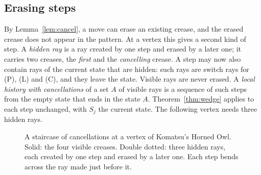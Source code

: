 \documentclass[11pt]{article}
\theoremstyle{definition}
\theoremstyle{remark}
\newcommand{\hid}[1]{\bar{#1}}
\begin{document}
\subsection{Erasing steps}

By Lemma~\ref{lem:cancel}, a move can erase an existing crease, and the erased crease does not appear in the pattern. At a vertex this gives a second kind of step. A \emph{hidden ray} is a ray created by one step and erased by a later one; it carries two creases, the \emph{first} and the \emph{cancelling} crease. A step may now also contain rays of the current state that are hidden: such rays are switch rays for (P), (L) and (C), and they leave the state. Visible rays are never erased. A \emph{local history with cancellations} of a set $A$ of visible rays is a sequence of such steps from the empty state that ends in the state $A$. Theorem~\ref{thm:wedge} applies to each step unchanged, with $S_j$ the current state. The following vertex needs three hidden rays.

\begin{figure}[t]
\centering
{}
\caption{A staircase of cancellations at a vertex of Komatsu's Horned Owl. Solid: the four visible creases. Double dotted: three hidden rays, each created by one step and erased by a later one. Each step bends across the ray made just before it.}
\label{fig:stair}
\end{figure}
\end{document}
